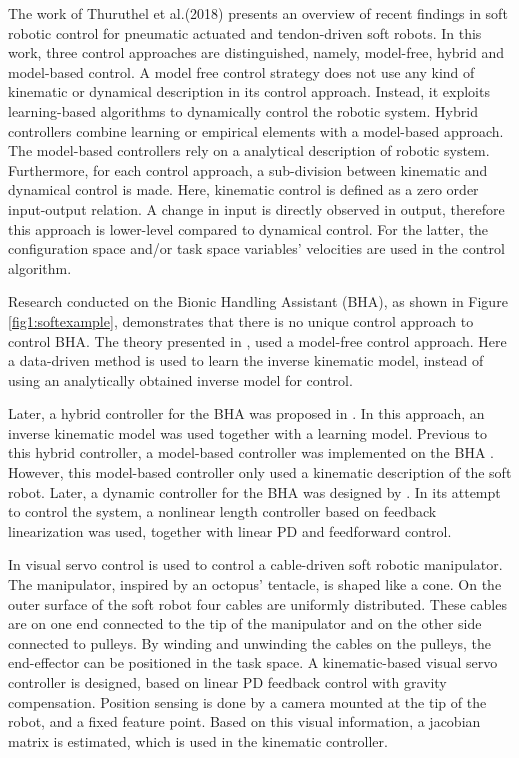 The work of Thuruthel et al.(2018) \cite{george2018control} presents an overview of recent findings in soft robotic control for pneumatic actuated and tendon-driven soft robots. In this work, three control approaches are distinguished, namely, model-free, hybrid and model-based control. A model free control strategy does not use any kind of kinematic or dynamical description in its control approach. Instead, it exploits learning-based algorithms to dynamically control the robotic system. Hybrid controllers combine learning or empirical elements with a model-based approach. The model-based controllers rely on a analytical description of robotic system. Furthermore, for each control approach, a sub-division between kinematic and dynamical control is made. Here, kinematic control is defined as a zero order input-output relation. A change in input is directly observed in output, therefore this approach is lower-level compared to dynamical control. For the latter, the configuration space and/or task space variables' velocities are used in the control algorithm. 


Research conducted on the Bionic Handling Assistant (BHA), as shown in Figure \ref{fig1:softexample}, demonstrates that there is no unique control approach to control BHA. The theory presented in \cite{rolf2013efficient}, used a model-free control approach. Here a data-driven method is used to learn the inverse kinematic model, instead of using an analytically obtained inverse model for control.

Later, a hybrid controller for the BHA was proposed in \cite{reinhart2017hybrid}. In this approach, an inverse kinematic model was used together with a learning model. Previous to this hybrid controller, a model-based controller was implemented on the BHA \cite{mahl2014bhakin}. However, this model-based controller only used a kinematic description of the soft robot. Later, a dynamic controller for the BHA was designed by \cite{falkenhahn2016dynamic}. In its attempt to control the system, a nonlinear length controller based on feedback linearization was used, together with linear PD and feedforward control. 

In \cite{wang2013visual} visual servo control is used to control a cable-driven soft robotic manipulator. The manipulator, inspired by an octopus' tentacle, is shaped like a cone. On the outer surface of the soft robot four cables are uniformly distributed. These cables are on one end connected to the tip of the manipulator and on the other side connected to pulleys. By winding and unwinding the cables on the pulleys, the end-effector can be positioned in the task space. A kinematic-based visual servo controller is designed, based on linear PD feedback control with gravity compensation. Position sensing is done by a camera mounted at the tip of the robot, and a fixed feature point. Based on this visual information, a jacobian matrix is estimated, which is used in the kinematic controller.

